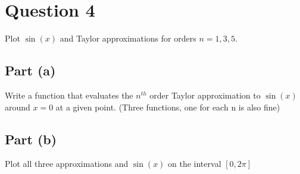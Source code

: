 \section{Question 4}

\begin{question}
   Plot $\sin{(x)}$ and Taylor approximations for orders $n = 1,3,5$.
\end{question}

\subsection{Part (a)}

\begin{question}
    Write a function that evaluates the $n^{th}$ order Taylor approximation to $\sin{(x)}$ around $x = 0$ at a given point. (Three functions, one for each n is also fine)
\end{question}

\begin{answer}
    
\end{answer}

\subsection{Part (b)}

\begin{question}
    Plot all three approximations and $\sin{(x)}$ on the interval $[0,2\pi]$
\end{question}

\begin{answer}
    
\end{answer}